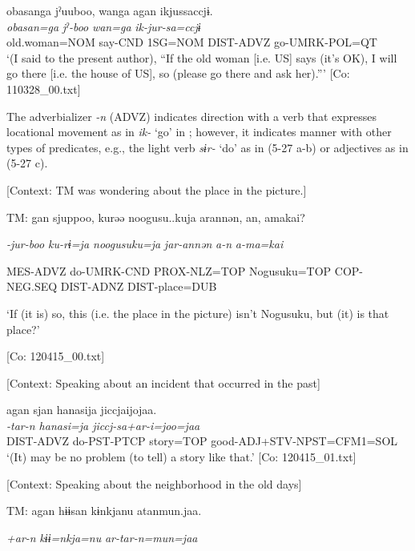 \glll  {\textbar}obasan{\textbar}ga  jˀuuboo,  wanga  agan  ikjussaccjɨ.\\
\textit{obasan=ga}  \textit{jˀ-boo}  \textit{wan=ga}  \textit{}  \textit{ik-jur-sa=ccjɨ}\\
old.woman=NOM  say-CND  1SG=NOM  DIST-ADVZ  go-UMRK-POL=QT\\
\glt ‘(I said to the present author), “If the old woman [i.e. US] says (it’s OK), I will go there [i.e. the house of US], so (please go there and ask her).”’ [Co: 110328\_00.txt]
\z

The adverbializer \textit{{}-n} (ADVZ) indicates direction with a verb that expresses locational movement as in \textit{ik-} ‘go’ in ; however, it indicates manner with other types of predicates, e.g., the light verb \textit{sɨr-} ‘do’ as in (5-27 a-b) or adjectives as in (5-27 c).

\ea \label{ex:5:27}  \ea \label{ex:5:27a} [Context: TM was wondering about the place in the picture.]

    TM:  gan  sjuppoo,  kurəə  noogusu..kuja   arannən,  an,  amakai?

      \textit{}  \textit{-jur-boo  ku-rɨ=ja  noogusuku=ja} \textit{jar-annən}  \textit{a-n}  \textit{a-ma=kai}
                                                                    
      MES-ADVZ  do-UMRK-CND  PROX-NLZ=TOP  Nogusuku=TOP  COP-NEG.SEQ  DIST-ADNZ  DIST-place=DUB

      ‘If (it is) so, this (i.e. the place in the picture) isn’t Nogusuku, but (it) is that place?’

      [Co: 120415\_00.txt]

 \ex \label{ex:5:b} [Context: Speaking about an incident that occurred in the past]

\glll  agan  sjan  hanasija  jiccjaijojaa.\\
\textit{}  \textit{-tar-n  hanasi=ja  jiccj-sa+ar-i=joo=jaa}\\
DIST-ADVZ  do-PST-PTCP  story=TOP  good-ADJ+STV-NPST=CFM1=SOL\\
\glt ‘(It) may be no problem (to tell) a story like that.’ [Co: 120415\_01.txt]

 \ex \label{ex:5:c} [Context: Speaking about the neighborhood in the old days]

    TM:  agan  hɨɨsan  kɨnkjanu   atanmun.jaa.

      \textit{}  \textit{+ar-n}  \textit{kɨɨ=nkja=nu}   \textit{ar-tar-n=mun=jaa}
                                                                  
